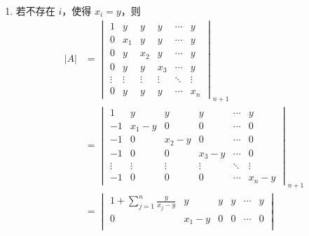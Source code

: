 \begin{exercise}
\begin{exgroup}
\begin{answer}
\begin{enumerate}
\begin{enumerate}
                            \item 若不存在 $i$，使得 $x_i = y$，则
                                \begin{align*}
                                    |A| &= \begin{vmatrix}
                                        1      & y      & y      & y      & \cdots & y      \\
                                        0      & x_1    & y      & y      & \cdots & y      \\
                                        0      & y      & x_2    & y      & \cdots & y      \\
                                        0      & y      & y      & x_3    & \cdots & y      \\
                                        \vdots & \vdots & \vdots & \vdots & \ddots & \vdots \\
                                        0      & y      & y      & y      & \cdots & x_n
                                    \end{vmatrix}_{n+1} \\
                                    &= \begin{vmatrix}
                                        1      & y      & y      & y      & \cdots & y      \\
                                        -1     & x_1-y  & 0      & 0      & \cdots & 0      \\
                                        -1     & 0      & x_2-y  & 0      & \cdots & 0      \\
                                        -1     & 0      & 0      & x_3-y  & \cdots & 0      \\
                                        \vdots & \vdots & \vdots & \vdots & \ddots & \vdots \\
                                        -1     & 0      & 0      & 0      & \cdots & x_n-y
                                    \end{vmatrix}_{n+1} \\
                                    &= \begin{vmatrix}
                                        1 + \sum_{j=1}^n \frac{y}{x_j-y} & y      & y      & y      & \cdots & y      \\
                                        0                                & x_1-y  & 0      & 0      & \cdots & 0      \\

\end{vmatrix}
\end{align*}
\end{enumerate}
\end{enumerate}
\end{answer}
\end{exgroup}
\end{exercise}
